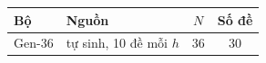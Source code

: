 \begin{tabular}{llcc}
\toprule
Bộ & Nguồn & $N$ & Số đề\\
\midrule
Gen-36 & tự sinh, 10 đề mỗi $h$ & 36 & 30\\
\bottomrule
\end{tabular}
